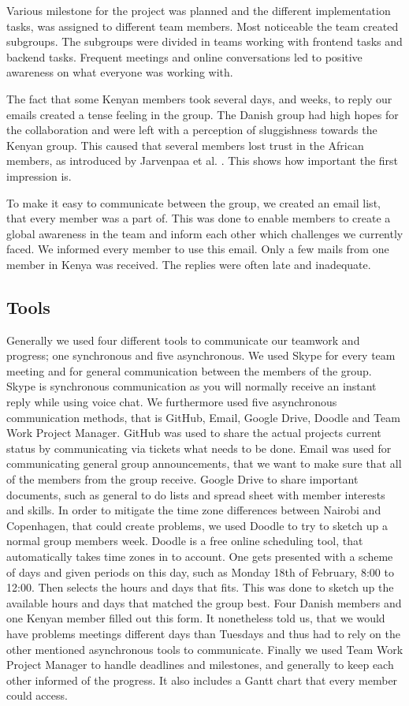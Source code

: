 Various milestone for the project was planned and the different implementation tasks, was assigned to different team members. Most noticeable the team created subgroups. The subgroups were divided in teams working with frontend tasks and backend tasks. Frequent meetings and online conversations led to positive awareness \cite{leinonen2005conceptualizing} on what everyone was working with.

The fact that some Kenyan members took several days, and weeks, to reply our emails created a tense feeling in the group. The Danish group had high hopes for the collaboration and were left with a perception of sluggishness towards the Kenyan group. This caused that several members lost trust in the African members, as introduced by Jarvenpaa et al. \cite{jarvenpaa1998communication}. This shows how important the first impression is.

To make it easy to communicate between the group, we created an email list, that every member was a part of. This was done to enable members to create a global awareness in the team and inform each other which challenges we currently faced. We informed every member to use this email. Only a few mails from one member in Kenya was received. The replies were often late and inadequate.

\subsection{Tools} \label{sec:tools}
Generally we used four different tools to communicate our teamwork and progress; one synchronous and five asynchronous. We used Skype for every team meeting and for general communication between the members of the group. Skype is synchronous communication as you will normally receive an instant reply while using voice chat. We furthermore used five asynchronous communication methods, that is GitHub, Email, Google Drive, Doodle and Team Work Project Manager. GitHub was used to share the actual projects current status by communicating via tickets what needs to be done. Email was used for communicating general group announcements, that we want to make sure that all of the members from the group receive. Google Drive to share important documents, such as general to do lists and spread sheet with member interests and skills. In order to mitigate the time zone differences between Nairobi and Copenhagen, that could create problems, we used Doodle to try to sketch up a normal group members week. Doodle is a free online scheduling tool, that automatically takes time zones in to account. One gets presented with a scheme of days and given periods on this day, such as Monday 18th of February, 8:00 to 12:00. Then selects the hours and days that fits. This was done to sketch up the available hours and days that matched the group best. Four Danish members and one Kenyan member filled out this form. It nonetheless told us, that we would have problems meetings different days than Tuesdays and thus had to rely on the other mentioned asynchronous tools to communicate. Finally we used Team Work Project Manager to handle deadlines and milestones, and generally to keep each other informed of the progress. It also includes a Gantt chart that every member could access.


